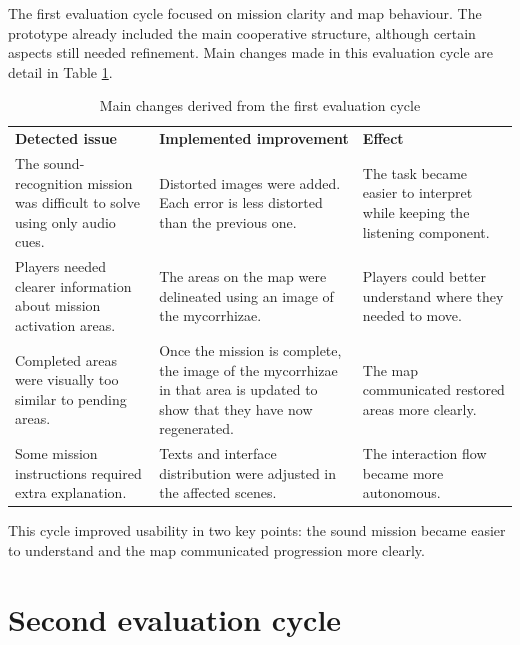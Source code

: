 The first evaluation cycle focused on mission clarity and map behaviour. The prototype already included the main cooperative structure, although certain aspects still needed refinement. Main changes made in this evaluation cycle are detail in Table \ref{tab:first_evaluation_cycle}.

\begin{table}[H]
\centering
\caption{Main changes derived from the first evaluation cycle}
\label{tab:first_evaluation_cycle}
\renewcommand{\arraystretch}{1.4}
\begin{tabular}{>{\raggedright\arraybackslash}p{}
                >{\raggedright\arraybackslash}p{}
                >{\raggedright\arraybackslash}p{}}
\rowcolor[HTML]{B0C9B0}
\textbf{Detected issue} & \textbf{Implemented improvement} & \textbf{Effect} \\
\rowcolor[HTML]{F0F5F0}
The sound-recognition mission was difficult to solve using only audio cues. & Distorted images were added. Each error is less distorted than the previous one. & The task became easier to interpret while keeping the listening component. \\
\rowcolor[HTML]{DFE8DF}
Players needed clearer information about mission activation areas. & The areas on the map were delineated using an image of the mycorrhizae. & Players could better understand where they needed to move. \\
\rowcolor[HTML]{F0F5F0}
Completed areas were visually too similar to pending areas. & Once the mission is complete, the image of the mycorrhizae in that area is updated to show that they have now regenerated. & The map communicated restored areas more clearly. \\
\rowcolor[HTML]{DFE8DF}
Some mission instructions required extra explanation. & Texts and interface distribution were adjusted in the affected scenes. & The interaction flow became more autonomous. \\
\end{tabular}
\end{table}

This cycle improved usability in two key points: the sound mission became easier to understand and the map communicated progression more clearly.



\section{Second evaluation cycle}
\label{sec:second_evaluation_cycle}

